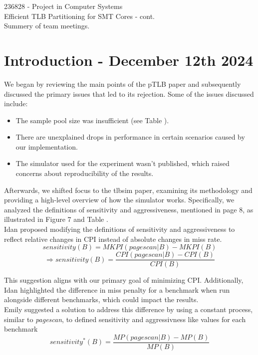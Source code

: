 \documentclass[10pt]{article}
\newcommand{\RNum}[1]{\uppercase\expandafter{\romannumeral #1\relax}}
\begin{document}
\begin{center}
    \huge 236828 - Project in Computer Systems \\
    \vspace{0.5cm}
    \Large Efficient TLB Partitioning for SMT Cores - cont. \\
    \vspace{0.3cm}
    \large Summery of team meetings.
\end{center}

\section{Introduction - December 12th 2024}
We began by reviewing the main points of the pTLB paper and subsequently discussed the primary
issues that led to its rejection. Some of the issues discussed include:
\begin{itemize}
    \item   The sample pool size was insufficient (see Table \RNum{4}).
    \item   There are unexplained drops in performance in certain scenarios caused by our
            implementation.
    \item   The simulator used for the experiment wasn't published, which raised concerns about
            reproducibility of the results.
\end{itemize}

Afterwards, we shifted focus to the tlbsim paper, examining its methodology and providing a
high-level overview of how the simulator works. Specifically, we analyzed the definitions
of sensitivity and aggressiveness, mentioned in page 8, as illustrated in Figure 7 and Table
\RNum{5}. \\

Idan proposed modifying the definitions of sensitivity and aggressiveness to reflect relative
changes in CPI instead of absolute changes in miss rate.
\[ sensitivity(B) = MKPI(pagescan \vert B) - MKPI(B) \]
\[ \Rightarrow sensitivity(B) = \frac{CPI(pagescan \vert B) - CPI(B)}{CPI(B)} \]

This suggestion aligns with our primary
goal of minimizing CPI. Additionally, Idan highlighted the difference in miss penalty for
a benchmark when run alongside different benchmarks, which could impact the results. \\

\noindent
Emily suggested a solution to address this difference by using a constant process, similar to
\textit{pagescan}, to defined sensitivity and aggressivness like values for each benchmark
\[ sensitivity^*(B) = \frac{MP(pagescan \vert B) - MP(B)}{MP(B)} \]
\end{document}
